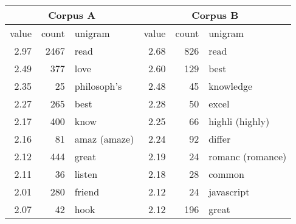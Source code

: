\documentclass[japanese]{jnlp_1.3d}
\begin{document}
\begin{table}[t]
	\label{tab:feature_unib}
	  \begin{center}
  \begin{tabular}{|r|r|l|r|r|l|} \hline
  \multicolumn{3}{|c|}{Corpus A} &  \multicolumn{3}{|c|}{Corpus B} \\ \hline  
value & count & unigram & value & count & unigram \\ \hline
2.97 & 2467 & read & 2.68 & 826 & read   \\  
2.49 & 377 & love & 2.60 & 129 & best   \\ 
2.35 & 25 & philosoph's & 2.48 & 45 & knowledge\\ 
2.27 & 265 & best & 2.28 & 50 & excel   \\ 
2.17 & 400 & know & 2.25 & 66 & highli (highly)  \\ 
2.16 & 81 & amaz (amaze)& 2.24 & 92 & differ   \\ 
2.12 & 444 & great & 2.19 & 24 & romanc (romance)  \\ 
2.11 & 36 & listen & 2.18 & 28 & common  \\ 
2.01 & 280 & friend & 2.12 & 24 & javascript   \\ 
2.07 & 42 & hook & 2.12 & 196 & great  \\ \hline
  \end{tabular}
  \end{center}
\end{table}
\end{document}
